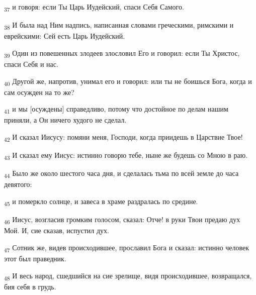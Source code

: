 \begin{tcolorbox}
\textsubscript{37} и говоря: если Ты Царь Иудейский, спаси Себя Самого.
\end{tcolorbox}
\begin{tcolorbox}
\textsubscript{38} И была над Ним надпись, написанная словами греческими, римскими и еврейскими: Сей есть Царь Иудейский.
\end{tcolorbox}
\begin{tcolorbox}
\textsubscript{39} Один из повешенных злодеев злословил Его и говорил: если Ты Христос, спаси Себя и нас.
\end{tcolorbox}
\begin{tcolorbox}
\textsubscript{40} Другой же, напротив, унимал его и говорил: или ты не боишься Бога, когда и сам осужден на то же?
\end{tcolorbox}
\begin{tcolorbox}
\textsubscript{41} и мы [осуждены] справедливо, потому что достойное по делам нашим приняли, а Он ничего худого не сделал.
\end{tcolorbox}
\begin{tcolorbox}
\textsubscript{42} И сказал Иисусу: помяни меня, Господи, когда приидешь в Царствие Твое!
\end{tcolorbox}
\begin{tcolorbox}
\textsubscript{43} И сказал ему Иисус: истинно говорю тебе, ныне же будешь со Мною в раю.
\end{tcolorbox}
\begin{tcolorbox}
\textsubscript{44} Было же около шестого часа дня, и сделалась тьма по всей земле до часа девятого:
\end{tcolorbox}
\begin{tcolorbox}
\textsubscript{45} и померкло солнце, и завеса в храме раздралась по средине.
\end{tcolorbox}
\begin{tcolorbox}
\textsubscript{46} Иисус, возгласив громким голосом, сказал: Отче! в руки Твои предаю дух Мой. И, сие сказав, испустил дух.
\end{tcolorbox}
\begin{tcolorbox}
\textsubscript{47} Сотник же, видев происходившее, прославил Бога и сказал: истинно человек этот был праведник.
\end{tcolorbox}
\begin{tcolorbox}
\textsubscript{48} И весь народ, сшедшийся на сие зрелище, видя происходившее, возвращался, бия себя в грудь.
\end{tcolorbox}
